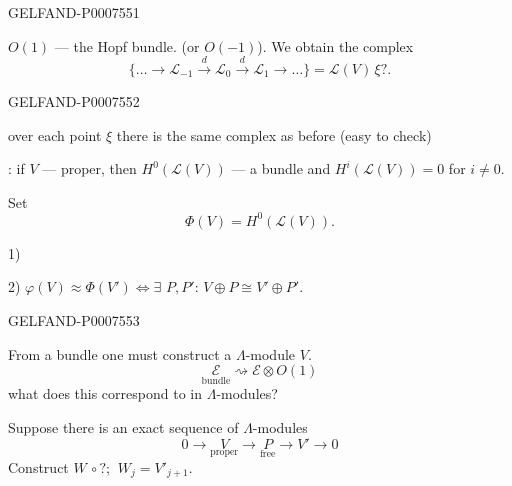\begin{GelfandAdjacentEvidence}{GELFAND-P000755}{1}

\(O(1)\) --- the Hopf bundle. (or \(O(-1)\)).
We obtain the complex
\begin{equation*}
\{\ldots\longrightarrow\mathcal L_{-1}
\xrightarrow{d}\mathcal L_0\xrightarrow{d}\mathcal L_1
\longrightarrow\ldots\}
=\mathcal L(V)\,\xi?.
\tag{11}
\end{equation*}
\end{GelfandAdjacentEvidence}
\begin{GelfandAdjacentEvidence}{GELFAND-P000755}{2}


over each point \(\xi\) there is the same complex as before (easy to check)

: if \(V\) --- proper, then
\(H^0(\mathcal L(V))\) --- a bundle and
\(H^i(\mathcal L(V))=0\) for \(i\ne0\).

Set
\begin{equation*}
\Phi(V)=H^0(\mathcal L(V)).
\tag{12}
\end{equation*}

1) 

2) \(\varphi(V)\approx\Phi(V')\Leftrightarrow\exists\)
 \(P,P'\):
\(V\oplus P\cong V'\oplus P'\).
\end{GelfandAdjacentEvidence}
\begin{GelfandAdjacentEvidence}{GELFAND-P000755}{3}



From a bundle one must construct a \(\Lambda\)-module \(V\).
\begin{equation*}
\underset{\text{bundle}}{\mathcal E}
\rightsquigarrow\mathcal E\otimes O(1)
\tag{13}
\end{equation*}
what does this correspond to in \(\Lambda\)-modules?

Suppose there is an exact sequence of \(\Lambda\)-modules
\begin{equation*}
0\longrightarrow\underset{\text{proper}}{V}
\longrightarrow\underset{\text{free}}{P}
\longrightarrow V'\longrightarrow0
\tag{14}
\end{equation*}
Construct \(W\,\circ?\); \(\ W_j=V'_{j+1}\).
\end{GelfandAdjacentEvidence}
